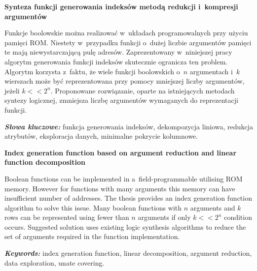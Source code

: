 \newpage
\vspace{10cm}

\newpage
\begin{center}
	\textbf{Synteza funkcji generowania indeksów metodą redukcji i~kompresji argumentów}
\end{center}

Funkcje boolowskie można realizować w~układach programowalnych przy użyciu pamięci ROM.
Niestety w~przypadku funkcji o~dużej liczbie argumentów pamięci te mają niewystarczającą pulę adresów.
Zaprezentowany w~niniejszej pracy algorytm generowania funkcji indeksów skutecznie ogranicza ten problem.
Algorytm korzysta z~faktu,
że wiele funkcji boolowskich o~$n$ argumentach i~$k$ wierszach może być reprezentowana przy pomocy mniejszej liczby argumentów,
jeżeli $k<<2^n$.
Proponowane rozwiązanie,
oparte na istniejących metodach syntezy logicznej,
zmniejsza liczbę argumentów wymaganych do reprezentacji funkcji.

\textit{\textbf{Słowa kluczowe:}} funkcja generowania indeksów, dekompozycja liniowa, redukcja atrybutów, eksploracja danych, minimalne pokrycie kolumnowe.

	\vspace{1cm}
\newpage

\begin{center}
    \textbf{Index generation function based on argument reduction and linear function decomposition}
\end{center}

Boolean functions can be implemented in a~field-programmable utilising ROM memory.
However for functions with many arguments this memory can have insufficient number of addresses.
The thesis provides an index generation function algorithm to solve this issue.
Many boolean functions with $n$ arguments and $k$ rows can be represented using fewer than $n$ arguments if only $k<<2^n$ condition occurs.
Suggested solution uses existing logic synthesis algorithms to reduce the set of arguments required in the function implementation.

\textit{\textbf{Keywords:}} index generation function, linear decomposition, argument reduction, data exploration, unate covering.

